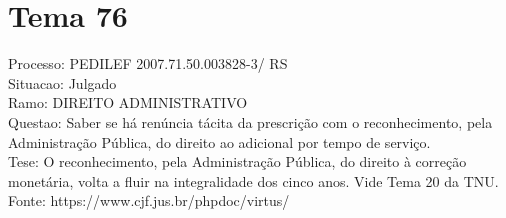 \documentclass[12pt]{article}
\begin{document}
\section*{Tema 76}
Processo: PEDILEF 2007.71.50.003828-3/ RS\\
Situacao: Julgado\\
Ramo: DIREITO ADMINISTRATIVO\\
Questao: Saber se há renúncia tácita da prescrição com o reconhecimento, pela Administração Pública, do direito ao adicional por tempo de serviço.\\
Tese: O reconhecimento, pela Administração Pública, do direito à correção monetária, volta a fluir na integralidade dos cinco anos. Vide Tema 20 da TNU.\\
Fonte: https://www.cjf.jus.br/phpdoc/virtus/
\end{document}
